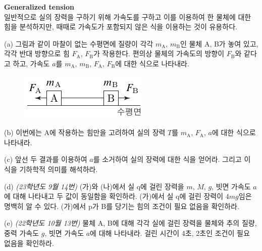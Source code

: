 \begin{prob}
	\label{prob3}
	\textbf{Generalized tension}\\
	일반적으로 실의 장력을 구하기 위해 가속도를 구하고 이를 이용하여 한 물체에 대한 힘을 분석하지만, 때때로 가속도가 포함되지 않은 식을 이용하는 것이 유용하다.
	
	(a) 그림과 같이 마찰이 없는 수평면에 질량이 각각 $m_{\mathrm{A}}$, $m_\mathrm{B}$인 물체 A, B가 놓여 있고, 각각 반대 방향으로 힘 $F_\mathrm{A}$, $F_\mathrm{B}$가 작용한다. 편의상 물체의 가속도의 방향이 $F_\mathrm{B}$와 같다고 하고, 가속도 $a$를 $m_{\mathrm{A}}$, $m_\mathrm{B}$, $F_\mathrm{A}$, $F_\mathrm{B}$에 대한 식으로 나타내라.\\
	\begin{figure}[H]
		\centering
		\includegraphics{images/prob.pdf}
	\end{figure}
	(b) 이번에는 A에 작용하는 힘만을 고려하여 실의 장력 $T$를 $m_{\mathrm{A}}$, $F_\mathrm{A}$, $a$에 대한 식으로 나타내라.
	
	(c) 앞선 두 결과를 이용하여 $a$를 소거하여 실의 장력에 대한 식을 얻어라. 그리고 이 식을 기하학적 의미를 해석하라.
	
	(d) \emph{(23학년도 9월 14번)} (가)와 (나)에서 실 q에 걸린 장력을 $m$, $M$, $g$, 빗면 가속도 $a$에 대해 나타내고 두 값이 동일함을 확인하라. (가)에서 실 q에 걸린 장력이 $4mg$임은 명백히 알 수 있다. (가)에서 p가 B를 당기는 힘의 조건이 필요 없음을 확인하라.
	
	(e) \emph{(22학년도 10월 13번)} 물체 A, B에 대해 각각 실에 걸린 장력을 물체와 추의 질량, 중력 가속도 $g$, 빗면 가속도 $a$에 대해 나타내라. 걸린 시간이 4초, 2초인 조건이 필요 없음을 확인하라.
	
\end{prob}
	

%
